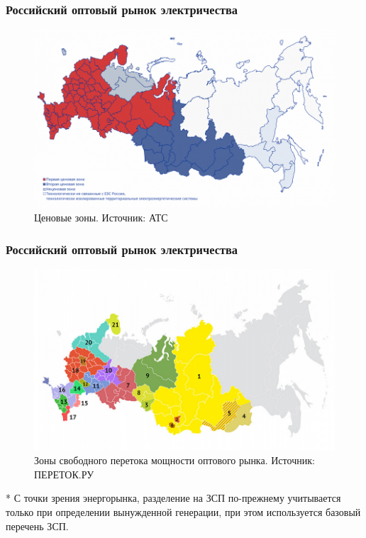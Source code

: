 \documentclass[c, dvipsnames]{beamer}  %
\begin{document}
\begin{frame}[shrink=5]
\frametitle{Российский оптовый рынок электричества} 


\begin{figure}
	\centering
	\includegraphics[width=1\linewidth]{screenshot014}
	\caption{ Ценовые зоны. Источник: АТС }
	\label{fig:screenshot013}
\end{figure}



\end{frame}







\begin{frame}[shrink=5]
\frametitle{Российский оптовый рынок электричества} 


\begin{figure}
	\centering
	\includegraphics[width=0.8\linewidth]{screenshot16}
	\caption{ Зоны свободного перетока мощности оптового рынка.  Источник: ПЕРЕТОК.РУ }
	\label{fig:screenshot015}
\end{figure}


\footnotesize{* С точки зрения энергорынка, разделение на ЗСП по-прежнему учитывается только при определении вынужденной генерации, при этом используется базовый перечень ЗСП.}


\end{frame}
\end{document}
